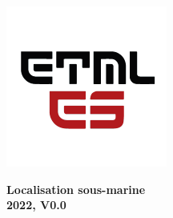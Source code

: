 \pagestyle{fancy}
\chead {\today}
\fontsize{16}{16}\selectfont

\author{Ali Zoubir }
\date{November 2022}

\pagestyle{fancy}

\chead {\monthyeardate\today}


\onecolumn


\begin{figure}
\begin{minipage}{0.47\textwidth}
\centering
\includegraphics[width=.4\textwidth,left,]{../ETML-ES-LOGO.png}
\end{minipage}

\hfill
\begin{minipage}{0.7\textwidth}
\raggedleft
\LARGE \textbf{Localisation sous-marine\\ 2022, V0.0}
\end{minipage}
\end{figure}

